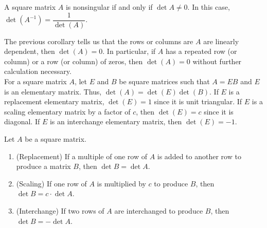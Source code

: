 \begin{Cor} A square matrix $A$ is nonsingular if and only if $\det A \neq 0$. In this case, $\det(A^{-1}) = \dfrac{1}{\det(A)}$.\end{Cor}\vs

The previous corollary tells us that the rows or columns are $A$ are linearly dependent, then $\det(A)=0$. In particular, if $A$ has a repeated row (or column) or a row (or column) of zeros, then $\det(A)=0$ without further calculation necessary.\\

For a square matrix $A$, let $E$ and $B$ be square matrices such that $A=EB$ and $E$ is an elementary matrix. Thus, $\det(A) = \det(E)\det(B)$. If $E$ is a replacement elementary matrix, $\det(E)=1$ since it is unit triangular. If $E$ is a scaling elementary matrix by a factor of $c$, then $\det(E) = c$ since it is diagonal. If $E$ is an interchange elementary matrix, then $\det(E)=-1$.\\

\begin{Thm}\label{row} Let $A$ be a square matrix.
\begin{enumerate}[!THM!, start=1]
\item (Replacement) If a multiple of one row of $A$ is added to another row to produce a matrix $B$, then $\det B = \det A$.\\
\item (Scaling) If one row of $A$ is multiplied by $c$ to produce $B$, then $\det B = c\cdot \det A$.\\
\item (Interchange) If two rows of $A$ are interchanged to produce $B$, then $\det B = -\det A$.\\
\end{enumerate}
\end{Thm}\vs

